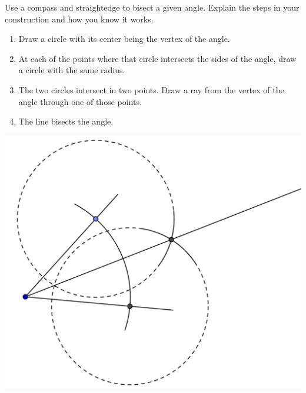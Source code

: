 \documentclass[nooutcomes]{ximera}
\begin{document}
\begin{problem}
Use a compass and straightedge to bisect a given angle. Explain the steps in your construction and how you know it works.
\begin{freeResponse}
\begin{hint}%
\begin{enumerate}
\item Draw a circle with its center being the vertex of the 
angle.
\item At each of the points where that circle intersects the sides of the angle, draw a circle with the same radius.
\item The two circles intersect in two points.  Draw a ray from the vertex of the angle through one of those points.  
\item The line bisects the angle.  
\end{enumerate}
\begin{image}
\includegraphics{bisectangle2.png}
\end{image}
\end{hint}
\end{freeResponse}
\end{problem}
\end{document}
